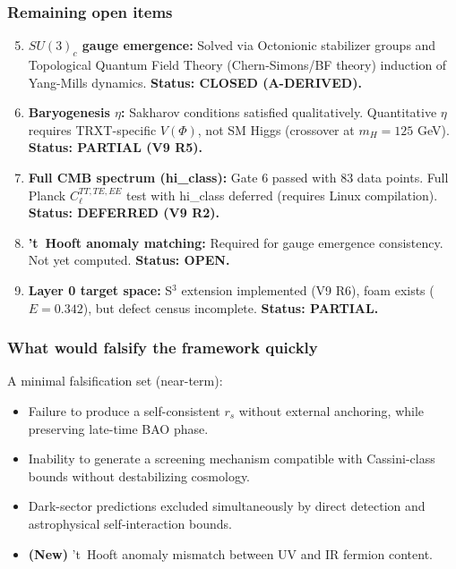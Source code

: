 \documentclass[a4paper,12pt]{article}
\begin{document}
\subsubsection{Remaining open items}
\begin{enumerate}
    \setcounter{enumi}{4}
    \item \textbf{$SU(3)_c$ gauge emergence:} Solved via Octonionic stabilizer groups and Topological Quantum Field Theory (Chern-Simons/BF theory) induction of Yang-Mills dynamics. \textbf{Status: CLOSED (A-DERIVED).}
    \item \textbf{Baryogenesis $\eta$:} Sakharov conditions satisfied qualitatively. Quantitative $\eta$ requires TRXT-specific $V(\Phi)$, not SM Higgs (crossover at $m_H = 125$ GeV). \textbf{Status: PARTIAL (V9 R5).}
    \item \textbf{Full CMB spectrum (hi\_class):} Gate 6 passed with 83 data points. Full Planck $C_\ell^{TT,TE,EE}$ test with hi\_class deferred (requires Linux compilation). \textbf{Status: DEFERRED (V9 R2).}
    \item \textbf{'t~Hooft anomaly matching:} Required for gauge emergence consistency. Not yet computed. \textbf{Status: OPEN.}
    \item \textbf{Layer 0 target space:} S$^3$ extension implemented (V9 R6), foam exists ($E = 0.342$), but defect census incomplete. \textbf{Status: PARTIAL.}
\end{enumerate}

\subsubsection{What would falsify the framework quickly}
A minimal falsification set (near-term):
\begin{itemize}
    \item Failure to produce a self-consistent $r_s$ without external anchoring, while preserving late-time BAO phase.
    \item Inability to generate a screening mechanism compatible with Cassini-class bounds without destabilizing cosmology.
    \item Dark-sector predictions excluded simultaneously by direct detection and astrophysical self-interaction bounds.
    \item \textbf{(New)} 't~Hooft anomaly mismatch between UV and IR fermion content.
\end{itemize}

\end{document}
